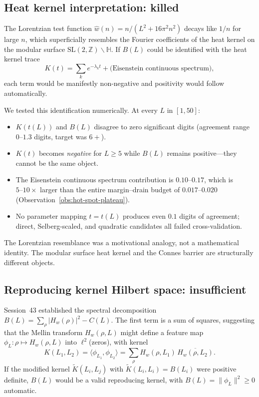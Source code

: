 \documentclass[11pt,a4paper]{article}
\begin{document}
\subsection{Heat kernel interpretation: killed}

The Lorentzian test function $\hat{w}(n) = n/(L^2 + 16\pi^2 n^2)$ decays like $1/n$ for large $n$, which superficially resembles the Fourier coefficients of the heat kernel on the modular surface $\mathrm{SL}(2,\mathbb{Z}) \backslash \mathbb{H}$. If $B(L)$ could be identified with the heat kernel trace
\[
  K(t) = \sum_k e^{-\lambda_k t} + \text{(Eisenstein continuous spectrum)},
\]
each term would be manifestly non-negative and positivity would follow automatically.

We tested this identification numerically. At every $L$ in $[1, 50]$:
\begin{itemize}
\item $K(t(L))$ and $B(L)$ disagree to zero significant digits (agreement range $0\text{--}1.3$ digits, target was $6+$).
\item $K(t)$ becomes \emph{negative} for $L \geq 5$ while $B(L)$ remains positive---they cannot be the same object.
\item The Eisenstein continuous spectrum contribution is $0.10\text{--}0.17$, which is $5\text{--}10\times$ larger than the entire margin--drain budget of $0.017\text{--}0.020$ (Observation~\ref{obs:hot-spot-plateau}).
\item No parameter mapping $t = t(L)$ produces even $0.1$ digits of agreement; direct, Selberg-scaled, and quadratic candidates all failed cross-validation.
\end{itemize}

The Lorentzian resemblance was a motivational analogy, not a mathematical identity. The modular surface heat kernel and the Connes barrier are structurally different objects.

\subsection{Reproducing kernel Hilbert space: insufficient}

Session~43 established the spectral decomposition $B(L) = \sum_\rho |H_w(\rho)|^2 - C(L)$. The first term is a sum of squares, suggesting that the Mellin transform $H_w(\rho, L)$ might define a feature map $\phi_L \colon \rho \mapsto H_w(\rho, L)$ into $\ell^2$(zeros), with kernel
\[
  K(L_1, L_2) = \langle \phi_{L_1}, \phi_{L_2} \rangle = \sum_\rho H_w(\rho, L_1)\, \overline{H_w(\rho, L_2)}.
\]
If the modified kernel $\tilde{K}(L_i, L_j)$ with $\tilde{K}(L_i, L_i) = B(L_i)$ were positive definite, $B(L)$ would be a valid reproducing kernel, with $B(L) = \|\phi_L\|^2 \geq 0$ automatic.
\end{document}
